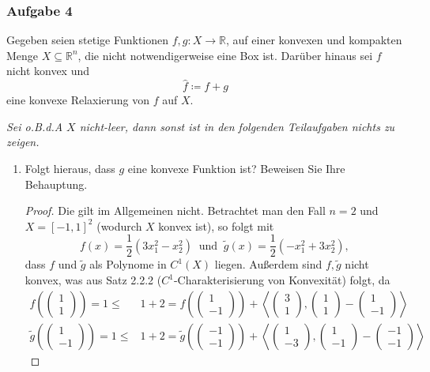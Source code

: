 \documentclass[12pt]{extreport} %
\newcommand{\R}{\mathbb{R}}
\begin{document}
\subsubsection*{Aufgabe 4}

Gegeben seien stetige Funktionen $f, g \colon X \rightarrow \R$, auf einer konvexen und kompakten Menge $X \subseteq \R^n$, die nicht notwendigerweise eine Box ist. Darüber hinaus sei $f$ nicht konvex und 
	$$ \hat{f} \coloneqq f + g $$
eine konvexe Relaxierung von $f$ auf $X$.

\textit{Sei o.B.d.A $X$ nicht-leer, dann sonst ist in den folgenden Teilaufgaben nichts zu zeigen.}	
	
\begin{enumerate}
	\item Folgt hieraus, dass $g$ eine konvexe Funktion ist? Beweisen Sie Ihre Behauptung.
		\begin{proof}
			Die gilt im Allgemeinen nicht. Betrachtet man den Fall $n = 2$ und $X = [-1, 1]^2$ (wodurch $X$ konvex ist), so folgt mit 
			$$ f(x) = \frac{1}{2} \left( 3 x_1^2 -  x_2^2 \right) ~ \text{ und } ~ \tilde{g}(x) = \frac{1}{2} \left( -x_1^2 + 3 x_2^2 \right), $$
			 dass $f$ und $\tilde{g}$ als Polynome in $C^1(X)$ liegen. Außerdem sind $f, \tilde{g}$ nicht konvex, was aus Satz 2.2.2 ($C^1$-Charakterisierung von Konvexität) folgt, da
			\begin{align*}
				f \left(\begin{pmatrix} 1 \\ 1 \end{pmatrix} \right) = 1 \leq & 1 + 2 = f \left(\begin{pmatrix} 1 \\ -1 \end{pmatrix} \right) + \left\langle \begin{pmatrix} 3 \\ 1 \end{pmatrix} ,  \begin{pmatrix} 1 \\ 1 \end{pmatrix} -  \begin{pmatrix} 1 \\ -1 \end{pmatrix} \right\rangle \\
				\tilde{g} \left(\begin{pmatrix} 1 \\ -1 \end{pmatrix} \right) = 1 \leq & 1 + 2 = \tilde{g} \left(\begin{pmatrix} -1 \\ -1 \end{pmatrix} \right) + \left\langle \begin{pmatrix} 1 \\ -3 \end{pmatrix} ,  \begin{pmatrix} 1 \\ -1 \end{pmatrix} -  \begin{pmatrix} -1 \\ -1 \end{pmatrix} \right\rangle \

\end{align*}
\end{proof}
\end{enumerate}
\end{document}
